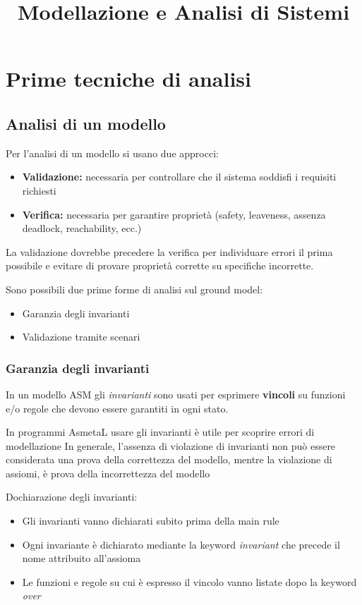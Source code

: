 \documentclass{report}
\title{\huge\textbf{{Modellazione e Analisi di Sistemi}}}
\date{}
\begin{document}
\maketitle

\tableofcontents
\newpage




\chapter{Prime tecniche di analisi}
\section{Analisi di un modello}
Per l'analisi di un modello si usano due approcci:
\begin{itemize}
    \item \textbf{Validazione:} necessaria per controllare che il
    sistema soddisfi i requisiti richiesti
    \item \textbf{Verifica:} necessaria per garantire proprietà
    (safety, leaveness, assenza deadlock,
    reachability, ecc.)
\end{itemize}
La validazione dovrebbe precedere la verifica per individuare errori il prima possibile
e evitare di provare proprietà corrette su specifiche incorrette.

\noindent Sono possibili due prime forme di analisi
sul ground model:
\begin{itemize}
    \item Garanzia degli invarianti
    \item Validazione tramite scenari
\end{itemize}

\subsection{Garanzia degli invarianti}
In un modello ASM gli \textit{invarianti} sono usati per esprimere \textbf{vincoli} su funzioni e/o regole
che devono essere garantiti in ogni stato. 

\noindent In programmi AsmetaL usare gli invarianti è utile per scoprire errori di modellazione
In generale, l'assenza di violazione di invarianti non può essere considerata una prova della correttezza del modello, mentre la violazione di
assiomi, è prova della incorrettezza del modello

\noindent Dochiarazione degli invarianti:
\begin{itemize}
    \item Gli invarianti vanno dichiarati subito prima della main rule
    \item Ogni invariante è dichiarato mediante la keyword \textit{invariant} che precede il nome attribuito all'assioma
    \item Le funzioni e regole su cui è espresso il vincolo vanno listate dopo la keyword \textit{over}
\end{itemize}
\end{document}
